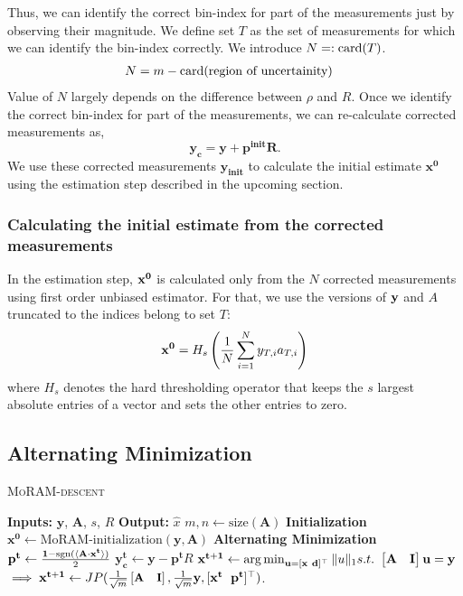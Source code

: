 Thus, we can identify the correct bin-index for part of the measurements just by observing their magnitude. We define set $T$ as the set of measurements for which we can identify the bin-index correctly. We introduce $N=: \mathrm{card}(T)$.
\begin{align*}
N & =  m - \mathrm{card}(\textnormal{region of uncertainity})
\end{align*}
Value of $N$ largely depends on the difference between $\rho$ and $R$.
Once we identify the correct bin-index for part of the measurements, we can re-calculate corrected measurements as,
$$
\mathbf{y_{c} = y + p^{init}R}.
$$
We use these corrected measurements $\mathbf{y_{init}}$ to calculate the initial estimate $\mathbf{{x}^0}$ using the estimation step described in the upcoming section.
\subsubsection{Calculating the initial estimate from the corrected measurements}
In the estimation step, $\mathbf{x^0}$ is calculated only from the $N$ corrected measurements using first order unbiased estimator. For that, we use the versions of $\mathbf{y}$ and $A$ truncated to the indices belong to set $T$:
\begin{equation}
\mathbf{x^0} = H_s\left( \frac{1}{N}\sum_{i=1}^{N}y_{T,i}a_{T,i}\right)
\label{eq:init}
\end{equation}
where $H_s$ denotes the hard thresholding operator that keeps the $s$ largest absolute entries of a vector and sets the other entries to zero.
\subsection{Alternating Minimization}
\label{sec:altmin}
\begin{algorithm}[H]
	\caption{\textsc{MoRAM-descent}}
	\label{alg:MoRAM}
	\begin{algorithmic}
		\State\textbf{Inputs:} $\mathbf{y}$, $\mathbf{A}$, $s$, $R$
		\State\textbf{Output:}  $\widehat{x}$
		\State $m,n \leftarrow \mathrm{size}(\mathbf{A})$ 
		\State \textbf{Initialization}
		\State $\mathbf{x^0} \leftarrow \textrm{MoRAM-initialization}(\mathbf{y, A})$ 
		\State \textbf{Alternating Minimization}
		\State $\mathbf{{p}^{t}} \leftarrow \frac{\mathbf{1}-\mathrm{sgn}(\langle \mathbf{A} \cdot \mathbf{x^t} \rangle)}{2}$
		\State $\mathbf{y^t_c} \leftarrow \mathbf{y} - \mathbf{p^t}R$
		\State $\mathbf{{x}^{t+1}}\leftarrow \operatorname*{arg\,min}_{\mathbf{u}=[\mathbf{x~d}]^\top}\|u\|_1  s.t.~ \begin{bmatrix} \mathbf{A} & \mathbf{I} \end{bmatrix}\mathbf{u} = \mathbf{y}$ 
		\State $\implies \mathbf{{x}^{t+1}}\leftarrow \small{JP(\frac{1}{\sqrt{m}}\begin{bmatrix} \mathbf{A} & \mathbf{I} \end{bmatrix},\frac{1}{\sqrt{m}}\mathbf{y},[\mathbf{x^t~~p^t}]^\top)}$.
		\EndFor
	\end{algorithmic}
\end{algorithm}

